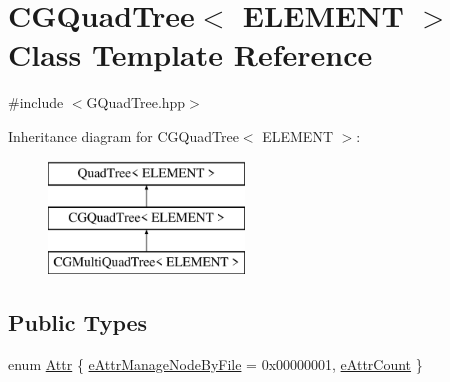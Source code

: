 \hypertarget{class_c_g_quad_tree}{}\section{C\+G\+Quad\+Tree$<$ E\+L\+E\+M\+E\+N\+T $>$ Class Template Reference}
\label{class_c_g_quad_tree}


{\ttfamily \#include $<$G\+Quad\+Tree.\+hpp$>$}

Inheritance diagram for C\+G\+Quad\+Tree$<$ E\+L\+E\+M\+E\+N\+T $>$\+:\begin{figure}[H]
\begin{center}
\leavevmode
\includegraphics[height=3.000000cm]{class_c_g_quad_tree}
\end{center}
\end{figure}
\subsection*{Public Types}
\begin{DoxyCompactItemize}
\item 
enum \hyperlink{class_c_g_quad_tree_a236a06574bc2a4206959053a2339982e}{Attr} \{ \hyperlink{class_c_g_quad_tree_a236a06574bc2a4206959053a2339982eaadcfb618dd4ad318798e7aa516198e30}{e\+Attr\+Manage\+Node\+By\+File} = 0x00000001, 
\hyperlink{class_c_g_quad_tree_a236a06574bc2a4206959053a2339982ea3837dff656475b7b1f5261e856c2190d}{e\+Attr\+Count}
 \}
\end{DoxyCompactItemize}
